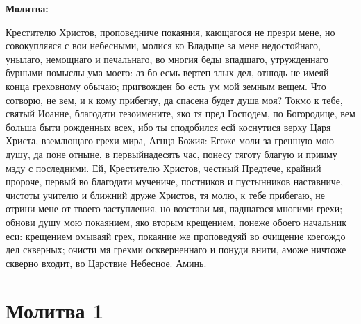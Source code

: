\bfseries Молитва:\normalfont{}


Крестителю Христов, проповедниче покаяния, кающагося не презри мене, но совокупляяся с вои небесными, молися ко Владыце за мене недостойнаго, унылаго, немощнаго и печальнаго, во многия беды впадшаго, утружденнаго бурными помыслы ума моего: аз бо есмь вертеп злых дел, отнюдь не имеяй конца греховному обычаю; пригвожден бо есть ум мой земным вещем. Что сотворю, не вем, и к кому прибегну, да спасена будет душа моя? Токмо к тебе, святый Иоанне, благодати тезоимените, яко тя пред Господем, по Богородице, вем больша быти рожденных всех, ибо ты сподобился есй коснутися верху Царя Христа, вземлющаго грехи мира, Агнца Божия: Егоже моли за грешную мою душу, да поне отныне, в первыйнадесять час, понесу тяготу благую и прииму мзду с последними. Ей, Крестителю Христов, честный Предтече, крайний пророче, первый во благодати мучениче, постников и пустынников наставниче, чистоты учителю и ближний друже Христов, тя молю, к тебе прибегаю, не отрини мене от твоего заступления, но возстави мя, падшагося многими грехи; обнови душу мою покаянием, яко вторым крещением, понеже обоего начальник еси: крещением омываяй грех, покаяние же проповедуяй во очищение коегождо дел скверных; очисти мя грехми оскверненнаго и понуди внити, аможе ничтоже скверно входит, во Царствие Небесное. Аминь.

\section{Молитва 1}
 



